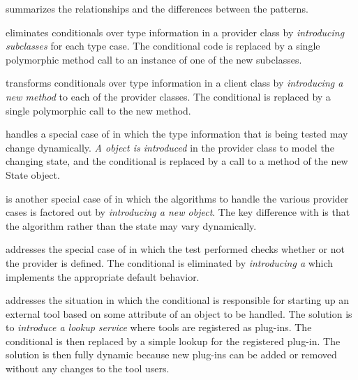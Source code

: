 \documentclass[a4paper,10pt,twoside]{book}
\begin{document}
 summarizes the relationships and the differences between the patterns.

\begin{bulletlist}
\item {} eliminates conditionals over type information in a provider class by \emph{introducing subclasses} for each type case. The conditional code is replaced by a single polymorphic method call to an instance of one of the new subclasses.

\item {} transforms conditionals over type information in a client class by \emph{introducing a new method} to each of the provider classes. The conditional is replaced by a single polymorphic call to the new method.

\item {} handles a special case of  in which the type information that is being tested may change dynamically. \emph{A  object is introduced} in the provider class to model the changing state, and the conditional is replaced by a call to a method of the new State object.

\item {} is another special case of  in which the algorithms to handle the various provider cases is factored out by \emph{introducing a new  object}. The key difference with  is that the algorithm rather than the state may vary dynamically.

\item {} addresses the special case of  in which the test performed checks whether or not the provider is defined. The conditional is eliminated by \emph{introducing a } which implements the appropriate default behavior.

\item {} addresses the situation in which the conditional is responsible for starting up an external tool based on some attribute of an object to be handled. The solution is to \emph{introduce a lookup service} where tools are registered as plug-ins. The conditional is then replaced by a simple lookup for the registered plug-in. The solution is then fully dynamic because new plug-ins can be added or removed without any changes to the tool users. 
\end{bulletlist}
\end{document}
